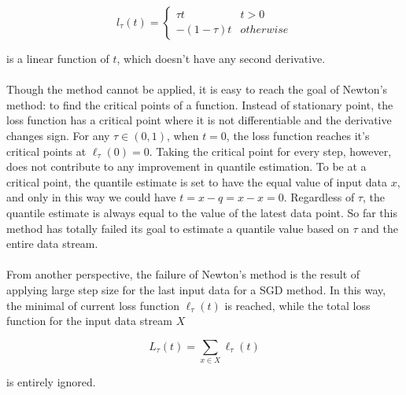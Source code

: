 \begin{equation}
    l_\tau(t)= 
        \begin{cases}
            \tau t & t > 0\\
            -(1-\tau) t & otherwise
        \end{cases}
\end{equation}


is a linear function of $t$, which doesn't have any second derivative. 
\\\\
Though the method cannot be applied, it is easy to reach the goal of Newton's method: to find the critical points of a function. Instead of stationary point, the loss function has a critical point where it is not differentiable and the derivative changes sign. For any $\tau \in (0,1)$, when $t=0$, the loss function reaches it's critical points at $\ell_\tau(0) = 0$. Taking the critical point for every step, however, does not contribute to any improvement in quantile estimation. To be at a critical point, the quantile estimate is set to have the equal value of input data $x$, and only in this way we could have $t = x-q = x-x = 0$. Regardless of $\tau$, the quantile estimate is always equal to the value of the latest data point. So far this method has totally failed its goal to estimate a quantile value based on $\tau$ and the entire data stream.
\\\\
From another perspective, the failure of Newton's method is the result of applying large step size for the last input data for a SGD method. In this way, the minimal of current loss function $\ell_\tau(t)$ is reached, while the total loss function for the input data stream $X$

\begin{equation}
    L_{\tau}(t) = \sum_{x \in X} \ell_{\tau}(t)
\end{equation}

is entirely ignored.